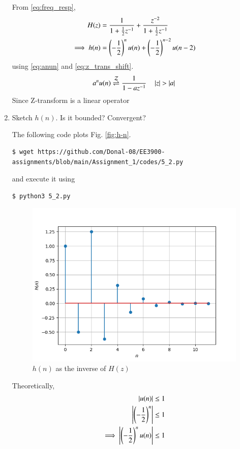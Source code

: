 \documentclass[journal,12pt,twocolumn]{IEEEtran}
\renewcommand\thesection{\arabic{section}}
\begin{document}
\begin{enumerate}[label=\thesection.\arabic*]
\solution From \eqref{eq:freq_resp},
\begin{align}
H(z) &= \frac{1}{1 + \frac{1}{2}z^{-1}} + \frac{ z^{-2}}{1 + \frac{1}{2}z^{-1}} \\
\implies h(n) &= \left(-\frac{1}{2}\right)^{n}u(n) + \left(-\frac{1}{2}\right)^{n-2}u(n-2)
\end{align}
using \eqref{eq:anun} and \eqref{eq:z_trans_shift}.
\begin{align}
	a^nu(n) \overset{\mathcal{Z}}{ \rightleftharpoons} \frac{1}{1-az^{-1}} \quad \left\vert z\right\vert > \left\vert a\right\vert
\end{align}
Since Z-transform is a linear operator 

\item Sketch $h(n)$. Is it bounded? Convergent? 

\solution The following code plots Fig. \eqref{fig:h-n}.
\begin{lstlisting}
$ wget https://github.com/Donal-08/EE3900-assignments/blob/main/Assignment_1/codes/5_2.py
\end{lstlisting}
and execute it using
\begin{lstlisting}
$ python3 5_2.py
\end{lstlisting}

\begin{figure}[!ht]
	\centering
	\includegraphics[width=\columnwidth]{figs/5_2.png}
	\caption{$h(n)$ as the inverse of $H(z)$}
	\label{fig:h-n}
\end{figure}
Theoretically,
	\begin{align}
		\left\vert u(n)\right\vert &\le 1 \\
		\left\vert\left(-\frac12\right)^n\right\vert &\le 1 \\
		\implies \left\vert\left(-\frac12\right)^n u(n)\right\vert &\le 1
	\end{align}
	

\end{enumerate}
\end{document}
